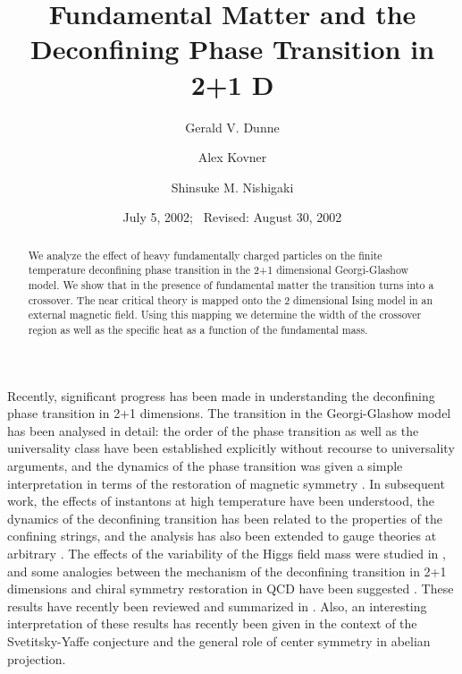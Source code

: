 \documentclass[a4paper,aps,prd,superscriptaddress,showpacs,showkeys]{revtex4}
\begin{document}
\preprint{}
\title{Fundamental Matter and the
Deconfining Phase Transition in 2+1 D}
\author{Gerald V. Dunne}
\author{Alex Kovner}
\author{Shinsuke M. Nishigaki}
\date{July 5, 2002;  \ Revised: August 30, 2002}
\begin{abstract}
We analyze the effect of heavy fundamentally charged particles on the
finite temperature deconfining phase transition in the
2+1 dimensional Georgi-Glashow model. We show that in the presence of
fundamental matter the transition turns into a crossover. The
near critical theory is mapped
onto the 2 dimensional Ising model in an external magnetic field.
Using this mapping we determine the width of the crossover region as well
as the specific heat as a function of the
fundamental mass.
\end{abstract}
\maketitle

Recently, significant progress has been made in understanding
the deconfining  phase transition in 2+1 dimensions. The transition in
the
\coordHE{} Georgi-Glashow model has been analysed in detail:
the order of the phase transition as well as the universality class have
been established explicitly without recourse to universality
arguments,
and the dynamics of the phase transition was given a simple
interpretation
in terms of the restoration of magnetic symmetry \cite{gg1}.
In subsequent work, the effects of instantons at high temperature have
been  understood, the dynamics of the deconfining transition
has been related to the properties of the confining strings, and
the analysis has also been extended to \coordHE{} gauge theories
at arbitrary \coordHE{} \cite{gg2}. The effects
of the variability of the Higgs field mass were studied in
\cite{antonov}, and some analogies between the
mechanism of the deconfining transition in 2+1 dimensions and chiral
symmetry restoration in QCD have been suggested \cite{gg3}.
These results have recently been reviewed and summarized in \cite{kk}.
Also, an interesting interpretation of these results has recently been
given \cite{mike} in the context of the Svetitsky-Yaffe conjecture
\cite{sy} and the general role of center symmetry in abelian projection.
\end{document}
